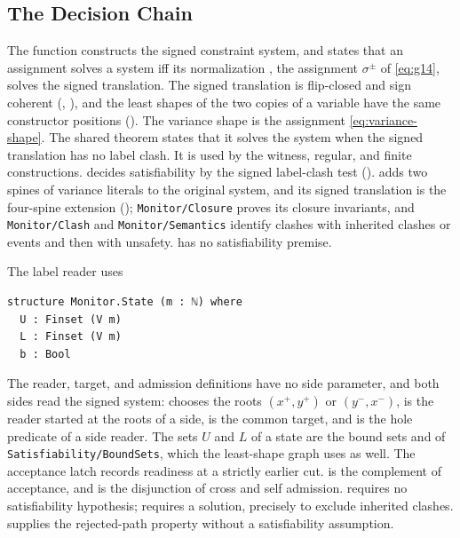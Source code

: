 \subsection{The Decision Chain}
\label{app:lean-decision}
The function  constructs the signed constraint system, and
 states that an assignment solves a system iff its
normalization , the assignment $\sigma^\pm$ of
\eqref{eq:g14}, solves the signed translation. The signed translation is
flip-closed and sign coherent (,
), and the least shapes of the two
copies of a variable have the same constructor positions
(). The variance shape
 is the assignment \eqref{eq:variance-shape}. The shared
theorem  states that it solves the system when the
signed translation has no label clash. It is used by the witness, regular,
and finite constructions.  decides satisfiability by the signed
label-clash test ().
 adds two spines of variance literals to the
original system, and its signed translation  is the
four-spine extension ();
\texttt{Monitor/Closure} proves its closure
invariants, and \texttt{Monitor/Clash} and \texttt{Monitor/Semantics}
identify clashes with inherited clashes or events and then with unsafety.
 has no satisfiability premise.

The label reader  uses
\begin{lstlisting}
structure Monitor.State (m : ℕ) where
  U : Finset (V m)
  L : Finset (V m)
  b : Bool
\end{lstlisting}
The reader, target, and admission definitions have no side parameter, and
both sides read the signed system:
 chooses the roots $(x^+,y^+)$ or $(y^-,x^-)$,
 is the reader started at the roots of a side,
 is the common target, and 
is the hole predicate of a side reader. The sets $U$ and $L$ of a state are
the bound sets  and  of
\texttt{Satisfiability/BoundSets}, which the least-shape graph uses as well.
The acceptance latch records readiness at a strictly earlier cut.
 is the complement of acceptance, and
 is the disjunction of cross and self admission.
 requires no satisfiability hypothesis;
 requires a solution, precisely to exclude
inherited clashes.  supplies the rejected-path
property without a satisfiability assumption.

